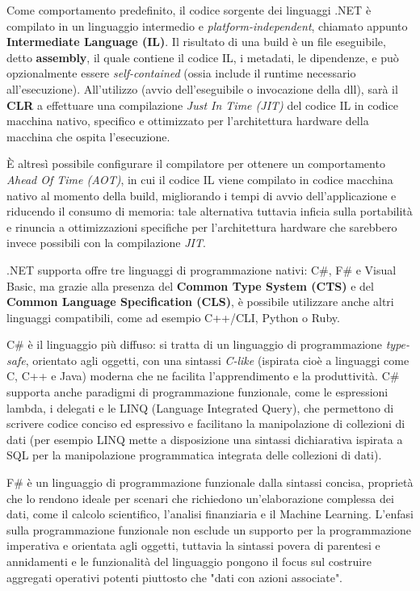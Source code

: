Come comportamento predefinito, il codice sorgente dei linguaggi .NET è compilato in un linguaggio intermedio e \emph{platform-independent}, chiamato appunto \textbf{Intermediate Language (IL)}. Il risultato di una build è un file eseguibile, detto \textbf{assembly}, il quale contiene il codice IL, i metadati, le dipendenze, e può opzionalmente essere \emph{self-contained} (ossia include il runtime necessario all'esecuzione). All'utilizzo (avvio dell'eseguibile o invocazione della dll), sarà il \textbf{CLR} a effettuare una compilazione \emph{Just In Time (JIT)} del codice IL in codice macchina nativo, specifico e ottimizzato per l'architettura hardware della macchina che ospita l'esecuzione.

È altresì possibile configurare il compilatore per ottenere un comportamento \emph{Ahead Of Time (AOT)}, in cui il codice IL viene compilato in codice macchina nativo al momento della build, migliorando i tempi di avvio dell'applicazione e riducendo il consumo di memoria: tale alternativa tuttavia inficia sulla portabilità e rinuncia a ottimizzazioni specifiche per l'architettura hardware che sarebbero invece possibili con la compilazione \emph{JIT}.

.NET supporta offre tre linguaggi di programmazione nativi: C\#, F\# e Visual Basic, ma grazie alla presenza del \textbf{Common Type System (CTS)} e del \textbf{Common Language Specification (CLS)}, è possibile utilizzare anche altri linguaggi compatibili, come ad esempio C++/CLI, Python o Ruby.

C\# è il linguaggio più diffuso: si tratta di un linguaggio di programmazione \emph{type-safe}, orientato agli oggetti, con una sintassi \emph{C-like} (ispirata cioè a linguaggi come C, C++ e Java) moderna che ne facilita l'apprendimento e la produttività.
C\# supporta anche paradigmi di programmazione funzionale, come le espressioni lambda, i delegati e le LINQ (Language Integrated Query), che permettono di scrivere codice conciso ed espressivo e facilitano la manipolazione di collezioni di dati (per esempio LINQ mette a disposizione una sintassi dichiarativa ispirata a SQL per la manipolazione programmatica integrata delle collezioni di dati).

F\# è un linguaggio di programmazione funzionale dalla sintassi concisa, proprietà che lo rendono ideale per scenari che richiedono un'elaborazione complessa dei dati, come il calcolo scientifico, l'analisi finanziaria e il Machine Learning. L'enfasi sulla programmazione funzionale non esclude un supporto per la programmazione imperativa e orientata agli oggetti, tuttavia la sintassi povera di parentesi e annidamenti e le funzionalità del linguaggio pongono il focus sul costruire aggregati operativi potenti piuttosto che "dati con azioni associate".

